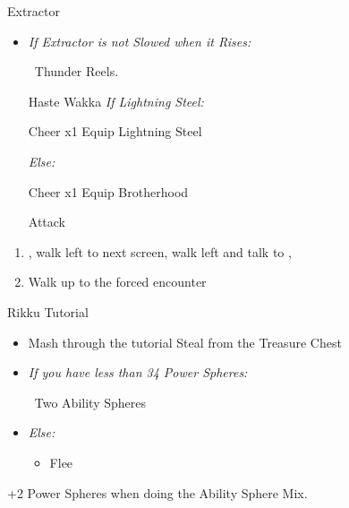 \bothvfill\winvfill\lossvfill
\begin{battle}[4000]{Extractor}
	\begin{itemize}
		\tidusf Haste self
		\wakkaf Attack
		\tidusf Attack Extractor until you apply Slow
		\item \textit{If Extractor is not Slowed when it Rises:}
			\begin{itemize}
				\wakkaf \od\ Thunder Reels.
			\end{itemize}
		\tidusf Haste Wakka
		\tidusf \textit{If Lightning Steel:}
			\begin{itemize}
				\tidusf Cheer x1
				\tidusf Equip Lightning Steel
			\end{itemize}
		\textit{Else:}
			\begin{itemize}
				\tidusf Cheer x1
				\tidusf Equip Brotherhood
			\end{itemize}
		\tidusf Attack
	\end{itemize}
\end{battle}
\begin{enumerate}[resume]
	\item \sd, walk left to next screen, walk left and talk to \rikku, \sd
	\item Walk up to the forced encounter
\end{enumerate}
\begin{battle}{Rikku Tutorial}
	\begin{itemize}
		\item Mash through the tutorial
		\rikkuf Steal from the Treasure Chest
		\item \textit{If you have less than 34 Power Spheres:}
		      \begin{itemize}
			      \rikkuf \od\ Two Ability Spheres
		      \end{itemize}
		\item \textit{Else:}
		      \begin{itemize}
			      \rikkuf \od\ Two Potions
				  \rikkuf Defend
				  \item Flee
		      \end{itemize}
	\end{itemize}
+2 Power Spheres when doing the Ability Sphere Mix.
\end{battle}

